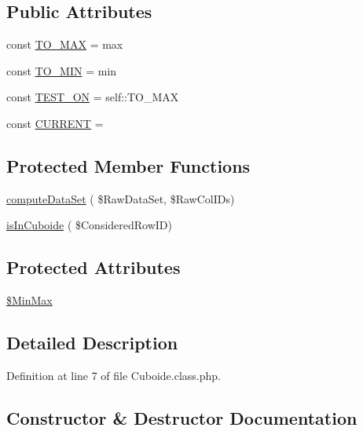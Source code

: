 \subsection*{Public Attributes}
\begin{DoxyCompactItemize}
\item 
const \hyperlink{class_cuboide_afd49ea48fafb0362d27f78f6f4ef8b84}{T\+O\+\_\+\+M\+AX} = \textquotesingle{}max\textquotesingle{}
\item 
const \hyperlink{class_cuboide_aa9d05eb5bedc8406d495de6132fb693b}{T\+O\+\_\+\+M\+IN} = \textquotesingle{}min\textquotesingle{}
\item 
const \hyperlink{class_cuboide_addf8c5b96a0aa67d15fc9502e748546a}{T\+E\+S\+T\+\_\+\+ON} = self\+::\+T\+O\+\_\+\+M\+AX
\item 
const \hyperlink{class_cuboide_a534dda68c1a0a0ebfc8644e6f4ded546}{C\+U\+R\+R\+E\+NT} = \textquotesingle{}\textquotesingle{}
\end{DoxyCompactItemize}
\subsection*{Protected Member Functions}
\begin{DoxyCompactItemize}
\item 
\hyperlink{class_cuboide_aec2eedda1f5b778028d663e925b19d02}{compute\+Data\+Set} ( \$Raw\+Data\+Set, \$Raw\+Col\+I\+Ds)
\item 
\hyperlink{class_cuboide_a3ff86ac8b2e6fa1bffdfb4404b4a01d3}{is\+In\+Cuboide} ( \$Considered\+Row\+ID)
\end{DoxyCompactItemize}
\subsection*{Protected Attributes}
\begin{DoxyCompactItemize}
\item 
\hyperlink{class_cuboide_a2efb593af39f6b2d067267ba4a9ffb4c}{\$\+Min\+Max}
\end{DoxyCompactItemize}


\subsection{Detailed Description}


Definition at line 7 of file Cuboide.\+class.\+php.



\subsection{Constructor \& Destructor Documentation}
\mbox{\label{class_cuboide_af2d05516a10563902f1e13a2f387e90b}} 
